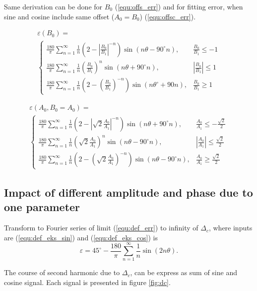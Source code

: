 \documentclass[a4paper]{article}
\begin{document}
Same derivation can be done for $B_0$ (\ref{equ:offs_err}) and for fitting error, when sine and cosine include same offset ($A_0 = B_0$) (\ref{equ:offsc_err}).

\begin{multline}
\label{equ:offs_err}
\varepsilon(B_0)=\\
\begin{cases}
\frac{180}{\pi}\sum_{n=1}^{\infty}\frac{1}{n}(2-|\frac{B_0}{B_1}|^{-n}) \sin (n \theta -  90^\circ n), & \frac{B_0}{B_1}\leq -1 \\
\frac{180}{\pi}\sum_{n=1}^{\infty}\frac{1}{n}(\frac{B_0}{B_1})^n \sin (n \theta + 90^\circ n), & |\frac{B_0}{B_1}|\leq 1 \\
\frac{180}{\pi}\sum_{n=1}^{\infty}\frac{1}{n}(2-(\frac{B_0}{B_1})^{-n}) \sin (n \theta^\circ + 90 n), & \frac{B_0}{B_1}\geq 1
\end{cases}
\end{multline}

\begin{multline}
\label{equ:offsc_err}
\varepsilon(A_0,B_0=A_0)=\\
\begin{cases}
\frac{180}{\pi}\sum_{n=1}^{\infty}\frac{1}{n}(2-|\sqrt{2}\frac{A_0}{A_1}|^{-n}) \sin (n \theta + 90^\circ n), & \frac{A_0}{A_1}\leq -\frac{\sqrt{2}}{2} \\
\frac{180}{\pi}\sum_{n=1}^{\infty}\frac{1}{n}(\sqrt{2}\frac{A_0}{A_1})^n \sin (n \theta - 90^\circ n), & |\frac{A_0}{A_1}|\leq \frac{\sqrt{2}}{2} \\
\frac{180}{\pi}\sum_{n=1}^{\infty}\frac{1}{n}(2-(\sqrt{2}\frac{A_0}{A_1})^{-n}) \sin (n \theta - 90^\circ n), & \frac{A_0}{A_1}\geq \frac{\sqrt{2}}{2}
\end{cases}
\end{multline}

\subsection{Impact of different amplitude and phase due to one parameter}
Transform to Fourier series  of limit (\ref{equ:def_err}) to infinity of  $\Delta_c$, where inputs are  (\ref{equ:def_eks_sin}) and (\ref{equ:def_eks_cos}) is
\begin{equation}
\label{equ:lim_dc_vrsta}
\varepsilon = 45^\circ -\frac{180}{\pi}\sum_{n=1}^{\infty}\frac{1}{n} \sin( 2 n \theta).
\end{equation}

The course of second harmonic due to $\Delta_c$, can be express as sum of sine and cosine signal. Each signal is presented in figure  \ref{fig:dc}.
\end{document}
